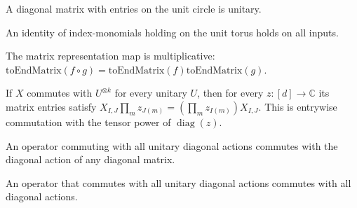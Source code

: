 \begin{theorem}\label{thm:diagonal_mem_unitaryGroup}
  \leanok
  A diagonal matrix with entries on the unit circle is unitary.
\end{theorem}

\begin{theorem}\label{thm:prod_eq_of_torus}
  \leanok
  An identity of index-monomials holding on the unit torus holds on all inputs.
\end{theorem}

\begin{theorem}\label{thm:toEndMatrix_comp}
  \leanok
  The matrix representation map is multiplicative: $\text{toEndMatrix}(f \circ g) = \text{toEndMatrix}(f) \text{toEndMatrix}(g)$.
\end{theorem}

{\chat
\begin{theorem}\label{thm:comm_diagAction_diagonal_entry}
  \leanok
  If $X$ commutes with $U^{\otimes k}$ for every unitary $U$, then for every $z:[d]\to\mathbb{C}$ its matrix entries satisfy $X_{I,J}\prod_m z_{J(m)}=(\prod_m z_{I(m)})X_{I,J}$. This is entrywise commutation with the tensor power of $\operatorname{diag}(z)$.
\end{theorem}
} %

{\chat
\begin{theorem}\label{thm:comm_diagAction_diagonal}
  \leanok
  An operator commuting with all unitary diagonal actions commutes with the diagonal action of any diagonal matrix.
\end{theorem}
} %

\begin{theorem}\label{thm:mem_centralizer_of_comm_unitary}
  \leanok
  An operator that commutes with all unitary diagonal actions commutes with all diagonal actions.
\end{theorem}

